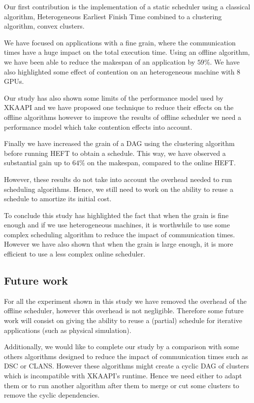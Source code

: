 \documentclass[10pt, conference, compsocconf,pdftex,dvipsnames]{IEEEtran}
\begin{document}
Our first contribution is the implementation of a static scheduler using
a classical algorithm, Heterogeneous Earliest Finish Time combined to a
clustering algorithm, convex clusters.

We have focused on applications with a fine grain, where the communication
times have a huge impact on the total execution time. Using an offline
algorithm, we have been able to reduce the makespan of an application by
$59\%$. We have also highlighted some effect of contention on an heterogeneous
machine with 8 GPUs. 

Our study has also shown some limits of the performance model used by XKAAPI
and we have proposed one technique to reduce their effects on the offline
algorithms however to improve the results of offline scheduler we need a
performance model which take contention effects into account.

Finally we have increased the grain of a DAG using the clustering algorithm
before running HEFT to obtain a schedule. This way, we have observed a
substantial gain up to $64\%$ on the makespan, compared to the online HEFT.

However, these results do not take into account the overhead needed to run
scheduling algorithms. Hence, we still need to work on the ability to reuse a
schedule to amortize its initial cost. 

To conclude this study has highlighted the fact that when the grain is fine
enough and if we use heterogeneous machines, it is worthwhile to use some 
complex scheduling algorithm to reduce the impact of communication times.
However we have also shown that when the grain is large enough, it is more
efficient to use a less complex online scheduler.

\subsection{Future work }
\label{chap:cncl-work}

For all the experiment shown in this study we have removed the overhead of the
offline scheduler, however this overhead is not negligible. Therefore some
future work will consist on giving the ability to reuse a (partial) schedule
for iterative applications (such as physical simulation).

Additionally, we would like to complete our study by a comparison with some
others algorithms designed to reduce the impact of communication times such as
DSC or CLANS. However these algorithms might create a cyclic DAG of clusters
which is incompatible with XKAAPI's runtime. Hence we need either to adapt
them or to run another algorithm after them to merge or cut some clusters to
remove the cyclic dependencies.
\end{document}
